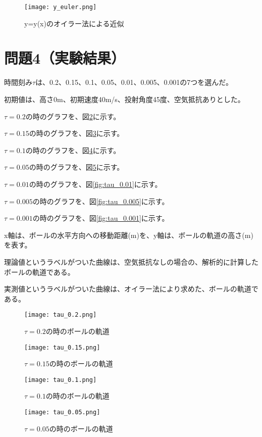 \documentclass[a4paper, 11pt, titlepage]{jsarticle}
\begin{document}
\begin{figure}[H]
	\centering
	\texttt{[image: y\_euler.png]}
	\caption{y=y(x)のオイラー法による近似}
	\label{fig:y_euler}
\end{figure}

\section{問題4（実験結果）}
時間刻み$\tau$は、0.2、0.15、0.1、0.05、0.01、0.005、0.001の7つを選んだ。

初期値は、高さ0m、初期速度40m/s、投射角度45度、空気抵抗ありとした。

$\tau = 0.2$の時のグラフを、図\ref{fig:tau_0.2}に示す。

$\tau = 0.15$の時のグラフを、図\ref{fig:tau_0.15}に示す。

$\tau = 0.1$の時のグラフを、図\ref{fig:tau_0.1}に示す。

$\tau = 0.05$の時のグラフを、図\ref{fig:tau_0.05}に示す。

$\tau = 0.01$の時のグラフを、図\ref{fig:tau_0.01}に示す。

$\tau = 0.005$の時のグラフを、図\ref{fig:tau_0.005}に示す。

$\tau = 0.001$の時のグラフを、図\ref{fig:tau_0.001}に示す。

x軸は、ボールの水平方向への移動距離(m)を、y軸は、ボールの軌道の高さ(m)を表す。

理論値というラベルがついた曲線は、空気抵抗なしの場合の、解析的に計算したボールの軌道である。

実測値というラベルがついた曲線は、オイラー法により求めた、ボールの軌道である。

\begin{figure}[H]
	\centering
	\texttt{[image: tau\_0.2.png]}
	\caption{$\tau = 0.2$の時のボールの軌道}
	\label{fig:tau_0.2}
\end{figure}

\begin{figure}[H]
	\centering
	\texttt{[image: tau\_0.15.png]}
	\caption{$\tau = 0.15$の時のボールの軌道}
	\label{fig:tau_0.15}
\end{figure}

\begin{figure}[H]
	\centering
	\texttt{[image: tau\_0.1.png]}
	\caption{$\tau = 0.1$の時のボールの軌道}
	\label{fig:tau_0.1}
\end{figure}

\begin{figure}[H]
	\centering
	\texttt{[image: tau\_0.05.png]}
	\caption{$\tau = 0.05$の時のボールの軌道}
	\label{fig:tau_0.05}
\end{figure}
\end{document}
